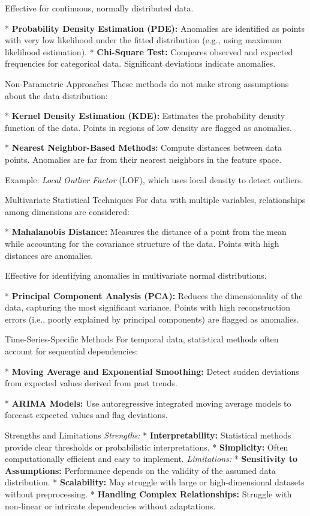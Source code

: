 Effective for continuous, normally distributed data.

* {\bf Probability Density Estimation (PDE):}\nl
Anomalies are identified as points with very low likelihood under the fitted distribution (e.g., using maximum likelihood estimation).
* {\bf Chi-Square Test:}\nl
Compares observed and expected frequencies for categorical data. Significant deviations indicate anomalies.
\enditems

\secc Non-Parametric Approaches
These methods do not make strong assumptions about the data distribution:

\begitems
* {\bf Kernel Density Estimation (KDE):}\nl
Estimates the probability density function of the data. Points in regions of low density are flagged as anomalies.

* {\bf Nearest Neighbor-Based Methods:}\nl
Compute distances between data points. Anomalies are far from their nearest neighbors in the feature space.

Example: {\em Local Outlier Factor} (LOF), which uses local density to detect outliers.
\enditems

\secc Multivariate Statistical Techniques
For data with multiple variables, relationships among dimensions are considered:

\begitems
* {\bf Mahalanobis Distance:}\nl
Measures the distance of a point from the mean while accounting for the covariance structure of the data. Points with high distances are anomalies.


Effective for identifying anomalies in multivariate normal distributions.


* {\bf Principal Component Analysis (PCA):}\nl
Reduces the dimensionality of the data, capturing the most significant variance. Points with high reconstruction errors (i.e., poorly explained by principal components) are flagged as anomalies.
\enditems

\secc Time-Series-Specific Methods
For temporal data, statistical methods often account for sequential dependencies:

\begitems
* {\bf Moving Average and Exponential Smoothing:}\nl
Detect sudden deviations from expected values derived from past trends.

* {\bf ARIMA Models:}\nl
Use autoregressive integrated moving average models to forecast expected values and flag deviations.
\enditems

\secc Strengths and Limitations
{\em Strengths:}
\begitems
 * {\bf Interpretability:} Statistical methods provide clear thresholds or probabilistic interpretations.
* {\bf Simplicity:} Often computationally efficient and easy to implement.
\enditems
{\em Limitations:}
\begitems
* {\bf Sensitivity to Assumptions:} Performance depends on the validity of the assumed data distribution.
* {\bf Scalability:} May struggle with large or high-dimensional datasets without preprocessing.
* {\bf Handling Complex Relationships:} Struggle with non-linear or intricate dependencies without adaptations.
\enditems

